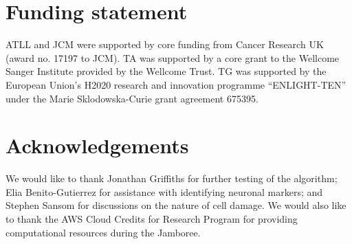 \documentclass[10pt,letterpaper]{article}
\begin{document}
\section*{Funding statement}
ATLL and JCM were supported by core funding from Cancer Research UK (award no. 17197 to JCM).
TA was supported by a core grant to the Wellcome Sanger Institute provided by the Wellcome Trust.
TG was supported by the European Union's H2020 research and innovation programme ``ENLIGHT-TEN'' under the Marie Sklodowska-Curie grant agreement 675395.

\section*{Acknowledgements}
We would like to thank Jonathan Griffiths for further testing of the algorithm;
Elia Benito-Gutierrez for assistance with identifying neuronal markers;
and Stephen Sansom for discussions on the nature of cell damage.
We would also like to thank the AWS Cloud Credits for Research Program for providing computational resources during the Jamboree.



\end{document}
